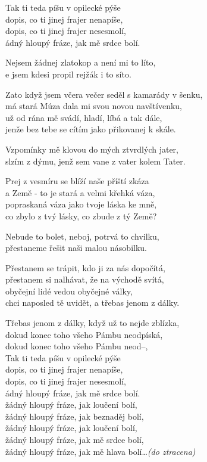 
\ve{}
Tak ti teda píšu v opilecké pýše\\
dopis, co ti jinej frajer nenapíše,\\
dopis, co ti jinej frajer nesesmolí,\\
ádný hloupý fráze, jak mě srdce bolí.

\cho{}
Nejsem žádnej zlatokop a není mi to líto,\\
e jsem kdesi propil rejžák i to síto.

\ve{}
Zato když jsem včera večer seděl s kamarády v šenku,\\
má stará Múza dala mi svou novou navštívenku,\\
už od rána mě svádí, hladí, líbá a tak dále,\\
jenže bez tebe se cítím jako přikovanej k skále.

\cho{}
Vzpomínky mě klovou do mých ztvrdlých jater,\\
slzím z dýmu, jenž sem vane z vater kolem Tater.

\ve{}
Prej z vesmíru se blíží naše příští zkáza\\
a Země - to je stará a velmi křehká váza,\\
popraskaná váza jako tvoje láska ke mně,\\
co zbylo z tvý lásky, co zbude z tý Země?

\cho{}
Nebude to bolet, neboj, potrvá to chvilku,\\
přestaneme řešit naši malou násobilku.

\ve{}
Přestanem se trápit, kdo ji za nás dopočítá,\\
přestanem si nalhávat, že na východě svítá,\\
obyčejní lidé vedou obyčejné války,\\
chci naposled tě uvidět, a třebas jenom z dálky.

\newpage

\ve{}
Třebas jenom z dálky, když už to nejde zblízka,\\
dokud konec toho všeho Pámbu neodpíská,\\
dokud konec toho všeho Pámbu neod--,\\
Tak ti teda píšu v opilecké pýše\\
dopis, co ti jinej frajer nenapíše,\\
dopis, co ti jinej frajer nesesmolí,\\
ádný hloupý fráze, jak mě srdce bolí.\\
žádný hloupý fráze, jak loučení bolí,\\
žádný hloupý fráze, jak beznaděj bolí,\\
žádný hloupý fráze, jak loučení bolí,\\
žádný hloupý fráze, jak mě srdce bolí,\\
žádný hloupý fráze, jak mě hlava bolí\ldots \textit{(do ztracena)}

\esong{}